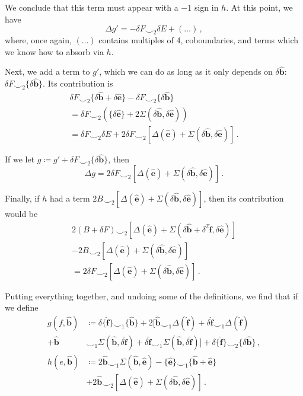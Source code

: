 \documentclass[aps,twocolumn,prx,floatfix,preprintnumbers, nofootinbib,10pt]{revtex4-2}
\numberwithin{equation}{section}
\theoremstyle{definition}
\theoremstyle{remark}
\theoremstyle{claim}
\newcommand{\be}{\begin{equation}}
\newcommand{\ee}{\end{equation}}
\newcommand{\paren}[1]{\left( #1 \right)}
\newcommand{\sqpar}[1]{\left[ #1 \right]}
\begin{document}
We conclude that this term must appear with a $-1$ sign in $h$. At this point, we have
\be
\Delta g' = - \delta F \smile_2 \delta E + (\dots) \,,
\ee
where, once again, $(\dots)$ contains multiples of 4, coboundaries, and terms which we know how to absorb via $h$.

Next, we add a term to $g'$, which we can do as long as it only depends on $\delta \bm{\hat{b}}$: $\delta F \smile_2 \{\delta \bm{\hat{b}}\}$. Its contribution is
\begin{multline}
 \delta F \smile_2 \{ \delta \bm{\hat{b}} + \delta \bm{\hat{e}} \} - \delta F \smile_2 \{ \delta \bm{\hat{b}} \} \\
 = \delta F \smile_2 \paren{ \{ \delta \bm{\hat{e}} \} + 2 \Sigma(\delta \bm{\hat{b}}, \delta \bm{\hat{e}}) } \\
 = \delta F \smile_2 \delta E + 2 \delta F \smile_2 \sqpar{\Delta(\bm{\hat{e}}) + \Sigma(\delta \bm{\hat{b}}, \delta \bm{\hat{e}})} \,.
\end{multline}

If we let $g \coloneqq g' + \delta F \smile_2 \{\delta \bm{\hat{b}}\}$, then
\be
\Delta g = 2 \delta F \smile_2 \sqpar{\Delta(\bm{\hat{e}}) + \Sigma(\delta \bm{\hat{b}}, \delta \bm{\hat{e}})} \,.
\ee

Finally, if $h$ had a term $2 B \smile_2 \sqpar{\Delta(\bm{\hat{e}}) + \Sigma(\delta \bm{\hat{b}}, \delta \bm{\hat{e}})}$, then its contribution would be
\begin{multline}
 2 (B + \delta F) \smile_2 \sqpar{\Delta(\bm{\hat{e}}) + \Sigma(\delta \bm{\hat{b}} + \delta^2 \bm{\hat{f}}, \delta \bm{\hat{e}}) } \\
 - 2 B \smile_2 \sqpar{\Delta(\bm{\hat{e}}) + \Sigma(\delta \bm{\hat{b}}, \delta \bm{\hat{e}}) } \\
 = 2 \delta F \smile_2 \sqpar{\Delta(\bm{\hat{e}}) + \Sigma(\delta \bm{\hat{b}}, \delta \bm{\hat{e}}) } \,.
\end{multline}

Putting everything together, and undoing some of the definitions, we find that if we define
\begin{align}
 g(f, \bm{\hat{b}}) &\coloneqq \delta \{\bm{\hat{f}}\} \smile_1 \{ \bm{\hat{b}} \} + 2 \Big[ \bm{\hat{b}} \smile_1 \Delta(\bm{\hat{f}}) + \delta \bm{\hat{f}} \smile_1 \Delta(\bm{\hat{f}}) \nonumber \\
+ \bm{\hat{b}} &\smile_1 \Sigma(\bm{\hat{b}}, \delta \bm{\hat{f}}) + \delta \bm{\hat{f}} \smile_1 \Sigma(\bm{\hat{b}}, \delta \bm{\hat{f}}) \Big] + \delta \{\bm{\hat{f}}\} \smile_2 \{\delta \bm{\hat{b}}\} \,, \\
h(e, \bm{\hat{b}}) &\coloneqq 2 \bm{\hat{b}} \smile_1 \Sigma(\bm{\hat{b}}, \bm{\hat{e}}) - \{\bm{\hat{e}}\} \smile_1 \{ \bm{\hat{b}} + \bm{\hat{e}} \} \nonumber \\
&+ 2 \bm{\hat{b}} \smile_2 \sqpar{\Delta(\bm{\hat{e}}) + \Sigma(\delta \bm{\hat{b}}, \delta \bm{\hat{e}}) } \,.
\end{align}
\end{document}
